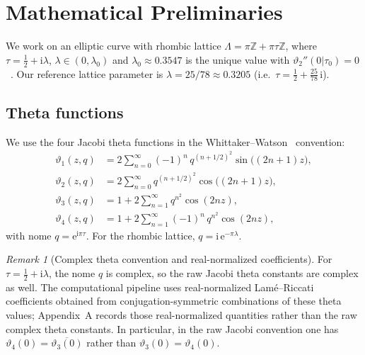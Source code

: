 \documentclass[11pt,a4paper]{article}
\theoremstyle{plain}
\theoremstyle{definition}
\theoremstyle{remark}
\newtheorem{remark}[theorem]{Remark}
\newcommand{\vt}[1]{\vartheta_{#1}}     %
\newcommand{\ZZ}{\mathbb{Z}}
\newcommand{\ee}{\mathrm{e}}
\newcommand{\ii}{\mathrm{i}}
\begin{document}
\section{Mathematical Preliminaries}\label{sec:prelim}

We work on an elliptic curve with rhombic lattice
$\Lambda = \pi\ZZ + \pi\tau\ZZ$, where
$\tau = \tfrac12 + \ii\lambda$, $\lambda \in (0,\lambda_0)$ and
$\lambda_0 \approx 0.3547$ is the unique value with
$\vt{2}''(0|\tau_0) = 0$~\cite[Lemma~8]{BHS-comp}.
Our reference lattice parameter is $\lambda = 25/78 \approx 0.3205$
(i.e.\ $\tau = \tfrac{1}{2} + \tfrac{25}{78}\,\ii$).

\subsection{Theta functions}\label{sec:theta}
We use the four Jacobi theta functions in the
Whittaker--Watson~\cite{WW27} convention:
\begin{align}
  \vt{1}(z,q) &= 2\sum_{n=0}^{\infty} (-1)^n\, q^{(n+1/2)^2}
    \sin\bigl((2n+1)z\bigr), \label{eq:theta1} \\
  \vt{2}(z,q) &= 2\sum_{n=0}^{\infty} q^{(n+1/2)^2}
    \cos\bigl((2n+1)z\bigr), \label{eq:theta2} \\
  \vt{3}(z,q) &= 1 + 2\sum_{n=1}^{\infty} q^{n^2}
    \cos(2nz), \label{eq:theta3} \\
  \vt{4}(z,q) &= 1 + 2\sum_{n=1}^{\infty} (-1)^n\, q^{n^2}
    \cos(2nz), \label{eq:theta4}
\end{align}
with nome $q = \ee^{\ii\pi\tau}$.  For the rhombic lattice,
$q = \ii\,\ee^{-\pi\lambda}$.

\begin{remark}[Complex theta convention and real-normalized coefficients]
  For $\tau = \tfrac12 + \ii\lambda$, the nome $q$ is complex, so the
  raw Jacobi theta constants are complex as well.  The computational
  pipeline uses real-normalized Lam\'e--Riccati coefficients obtained from
  conjugation-symmetric combinations of these theta values; Appendix~A
  records those real-normalized quantities rather than the raw complex
  theta constants.  In particular, in the raw Jacobi convention one has
  $\vt{4}(0) = \overline{\vt{3}(0)}$ rather than
  $\vt{3}(0) = \vt{4}(0)$.
\end{remark}
\end{document}
